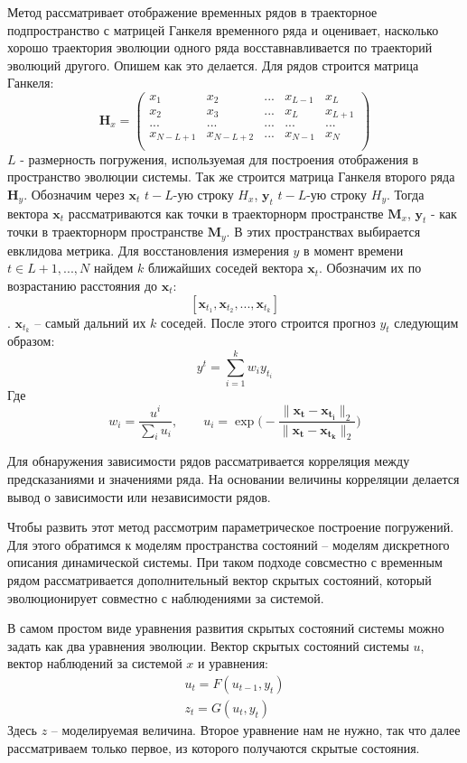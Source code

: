 \documentclass[12pt, twoside]{article}
\begin{document}
	Метод рассматривает отображение временных рядов в траекторное подпространство с матрицей Ганкеля временного ряда и оценивает, насколько хорошо траектория эволюции одного ряда восставнавливается по траекторий эволюций другого. Опишем как это делается. Для рядов строится матрица Ганкеля:
	$$
	\mathbf{H}_{x} =
	\left( {\begin{array}{ccccc}
			x_1 & x_2 & ... & x_{L-1} & x_L\\
			x_2 & x_3 & ... & x_{L} & x_{L +1}\\
			... & ... & ... & ...   & ... \\
			x_{N-L+1} & x_{N-L +2} & ... & x_{N-1} & x_N\\
	\end{array} } \right)
	$$
	$L$ - размерность погружения, используемая для построения отображения в пространство эволюции системы. Так же строится матрица Ганкеля второго ряда $\mathbf{H}_y$.
	Обозначим через $\mathbf{x}_{t}$ $t - L$-ую строку $H_x$, $\mathbf{y}_{t}$ $t - L$-ую строку $H_y$. Тогда вектора $\mathbf{x}_t$ рассматриваются как точки в траекторнорм пространстве $\mathbf{M}_x$, $\mathbf{y}_t$ - как точки в траекторнорм пространстве $\mathbf{M}_y$. В этих пространствах выбирается евклидова метрика.
	Для восстановления измерения $y$ в момент времени $t\in L + 1,..., N$ найдем $k$ ближайших соседей вектора $\mathbf{x}_t$. Обозначим их по возрастанию расстояния до $\mathbf{x}_t$:
	$$[\mathbf{x}_{t_1}, \mathbf{x}_{t_2}, ...,\mathbf{x}_{t_k}]$$. 
	$\mathbf{x}_{t_k}$ -- самый дальний их $k$ соседей. После этого строится прогноз $y_t$ следующим образом:
	$$
	y^t = \sum^k_{i = 1}w_iy_{t_i}$$
	Где
		$$	w_i = \frac{u^i}{\sum_i u_i}, \qquad u_i = \exp\bigg(-\frac{\|\mathbf{x_t} - \mathbf{x_{t_i}}\|_2}{\|\mathbf{x_t} - \mathbf{x_{t_k}}\|_2}\bigg)
	$$
	
	
	Для обнаружения зависимости рядов рассматривается корреляция между предсказаниями и значениями ряда. На основании величины корреляции делается вывод о зависимости или независимости рядов.
	
	Чтобы развить этот метод рассмотрим параметрическое построение погружений. Для этого обратимся к моделям пространства состояний -- моделям дискретного описания динамической системы. При таком подходе совсместно с временным рядом рассматривается дополнительный вектор скрытых состояний, который эволюционирует совместно с наблюдениями за системой.
	
	В самом простом виде уравнения развития скрытых состояний системы можно задать как два уравнения эволюции. Вектор скрытых состояний системы $u$, вектор наблюдений за системой $x$ и уравнения:
\begin{equation}
	\begin{split}
		u_t = F(u_{t-1}, y_t) \\ 
		z_{t} = G(u_t, y_t)
	\end{split}
\end{equation}
Здесь $z$ -- моделируемая величина. Второе уравнение нам не нужно, так что далее рассматриваем только первое, из которого получаются скрытые состояния.
\end{document}
